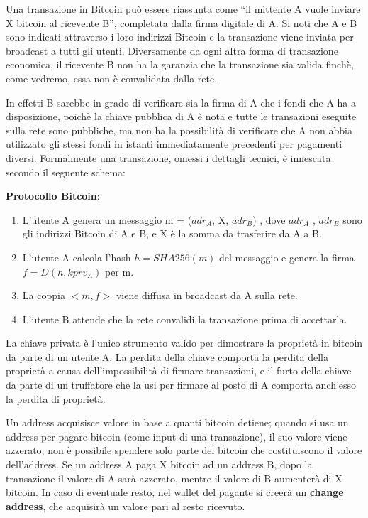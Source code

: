 Una transazione in Bitcoin può essere riassunta come “il mittente A vuole inviare X bitcoin al ricevente B”, completata dalla ﬁrma digitale di A. Si noti che A e B sono indicati attraverso i loro indirizzi Bitcoin e la transazione viene inviata per broadcast a tutti gli utenti. Diversamente da ogni altra forma di transazione economica, il ricevente B non ha la garanzia che la transazione sia valida ﬁnchè, come vedremo, essa non è convalidata dalla rete. 

In effetti B sarebbe in grado di veriﬁcare sia la ﬁrma di A che i fondi che A ha a disposizione, poichè la chiave pubblica di A è nota e tutte le transazioni eseguite sulla rete sono pubbliche, ma non ha la possibilità di veriﬁcare che A non abbia utilizzato gli stessi fondi in istanti immediatamente precedenti per pagamenti diversi. Formalmente una transazione, omessi i dettagli tecnici, è innescata secondo il seguente schema:
\begin{center}
\textbf{Protocollo Bitcoin}:
\begin{enumerate}
    \item L’utente A genera un messaggio m = ($adr_A$, X, $adr_B$) , dove $adr_A$ , $adr_B$ sono gli indirizzi Bitcoin di A e B, e X è la somma da trasferire da A a B.
    \item L’utente A calcola l’hash $h = SHA256(m)$ del messaggio e genera la ﬁrma $f = D(h, kprv_A)$ per m.
    \item La coppia $<m, f>$ viene diffusa in broadcast da A sulla rete.
    \item L’utente B attende che la rete convalidi la transazione prima di accettarla.
\end{enumerate}
\end{center}

La chiave privata è l’unico strumento valido per dimostrare la proprietà in bitcoin da parte di un utente A.
La perdita della chiave comporta la perdita della proprietà a causa dell’impossibilità di ﬁrmare transazioni, e il furto della chiave da parte di un truﬀatore che la usi per ﬁrmare al posto di A comporta anch’esso la perdita di proprietà.

Un address acquisisce valore in base a quanti bitcoin detiene; quando si usa un address per pagare bitcoin (come input di una transazione), il suo valore viene azzerato, non è possibile spendere solo parte dei bitcoin che costituiscono il valore dell’address. Se un address A paga X bitcoin ad un address B, dopo la transazione il valore di A sarà azzerato, mentre il valore di B aumenterà di X bitcoin. In caso di eventuale resto, nel wallet del pagante si creerà un \textbf{change address}, che acquisirà un valore pari al resto ricevuto.

